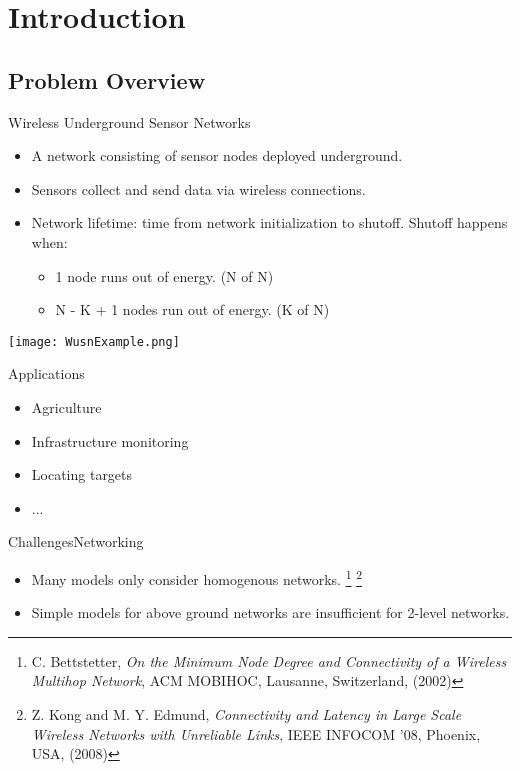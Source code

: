 \documentclass[main.tex]{subfiles}
\begin{document}
\section{Introduction}
\subsection{Problem Overview}
\begin{frame}{Wireless Underground Sensor Networks}
	\begin{itemize}
		\item A network consisting of sensor nodes deployed underground.
		\item Sensors collect and send data via wireless connections.
		\item {
			Network lifetime: time from network initialization to shutoff. Shutoff happens when:
			\begin{itemize}
				\item 1 node runs out of energy. (N of N)
				\item N - K + 1 nodes run out of energy. (K of N)
			\end{itemize}
		}
	\end{itemize}

	\begin{center}
    	\texttt{[image: WusnExample.png]}
	\end{center}
\end{frame}

\begin{frame}{Applications}
	\begin{itemize}
		\item Agriculture
		\item Infrastructure monitoring
		\item Locating targets
		\item ...
	\end{itemize}
\end{frame}

\begin{frame}{Challenges}{Networking}
	\begin{itemize}
		\item Many models only consider homogenous networks. \footnote{C. Bettstetter, \textit{On the Minimum Node Degree and Connectivity of a Wireless Multihop Network}, ACM MOBIHOC, Lausanne, Switzerland, (2002)} \footnote{Z. Kong and M. Y. Edmund, \textit{Connectivity and Latency in Large Scale Wireless Networks with Unreliable Links}, IEEE INFOCOM ’08, Phoenix, USA, (2008)}
		\item Simple models for above ground networks are insufficient for 2-level networks.
	\end{itemize}
\end{frame}
\end{document}
